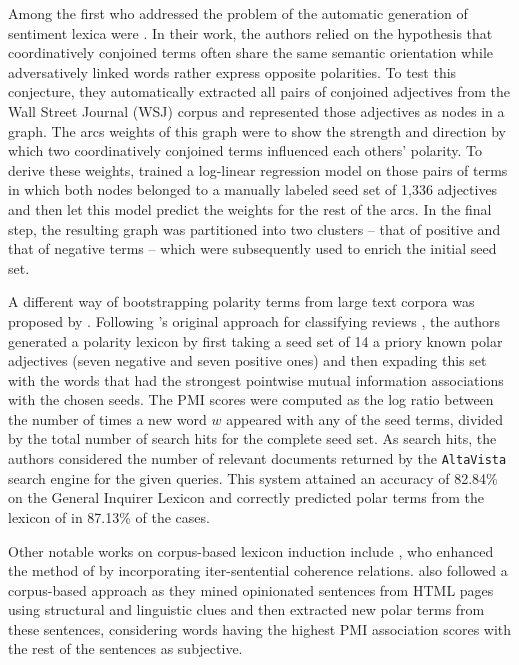 Among the first who addressed the problem of the automatic generation
of sentiment lexica were \citet{Hatzivassi:97}.  In their work, the
authors relied on the hypothesis that coordinatively conjoined terms
often share the same semantic orientation while adversatively linked
words rather express opposite polarities.  To test this conjecture,
they automatically extracted all pairs of conjoined adjectives from
the Wall Street Journal (WSJ) corpus and represented those adjectives
as nodes in a graph.  The arcs weights of this graph were to show the
strength and direction by which two coordinatively conjoined terms
influenced each others' polarity.  To derive these weights,
\citeauthor{Hatzivassi:97} trained a log-linear regression model on
those pairs of terms in which both nodes belonged to a manually
labeled seed set of 1,336 adjectives and then let this model predict
the weights for the rest of the arcs.  In the final step, the
resulting graph was partitioned into two clusters -- that of positive
and that of negative terms -- which were subsequently used to enrich
the initial seed set.

A different way of bootstrapping polarity terms from large text
corpora was proposed by \citet{Turney:03}.  Following
\citeauthor{Turney:02}'s original approach for classifying reviews
\citep{Turney:02}, the authors generated a polarity lexicon by first
taking a seed set of 14 a priory known polar adjectives (seven
negative and seven positive ones) and then expading this set with the
words that had the strongest pointwise mutual information associations
with the chosen seeds.  The PMI scores were computed as the log ratio
between the number of times a new word $w$ appeared with any of the
seed terms, divided by the total number of search hits for the
complete seed set.  As search hits, the authors considered the number
of relevant documents returned by the \texttt{AltaVista} search engine
for the given queries.  This system attained an accuracy of 82.84\% on
the General Inquirer Lexicon \citep{Stone:66} and correctly predicted
polar terms from the lexicon of \cite{Hatzivassi:97} in 87.13\% of the
cases. %

Other notable works on corpus-based lexicon induction include
\citet{Kanayama:06}, who enhanced the method of
\citeauthor{Hatzivassi:97} by incorporating iter-sentential coherence
relations.  \citet{Kaji:07} also followed a corpus-based approach as
they mined opinionated sentences from HTML pages using structural and
linguistic clues and then extracted new polar terms from these
sentences, considering words having the highest PMI association scores
with the rest of the sentences as subjective.

